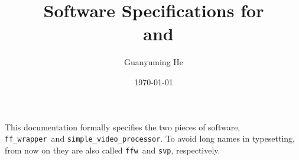 \documentclass{article}
\title{Software Specifications for\\
	\ffwrappername\ and \simplevideoprocessorname\\%
}
\author{Guanyuming He}
\date{\today}
\newcommand{\ffwrappername}{\texttt{ff\_wrapper}}
\newcommand{\ffwname}{\texttt{ffw}}
\newcommand{\simplevideoprocessorname}{\texttt{simple\_video\_processor}}
\newcommand{\svpname}{\texttt{svp}}
\begin{document}
\pagestyle{empty}	
\maketitle

\newpage
{}
\pagestyle{plain}
\tableofcontents

\newpage
{}
\pagestyle{headings}

This documentation formally specifies the two pieces of software, \ffwrappername\ and \simplevideoprocessorname. 
To avoid long names in typesetting, from now on they are also called \ffwname\ and \svpname, respectively.

\clearpage


\clearpage

	
\end{document}

